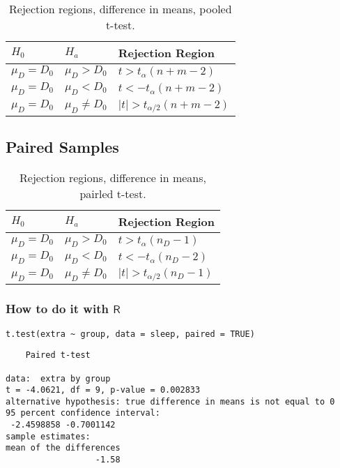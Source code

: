 \begin{table}[htb]
\caption[Rejection regions, difference in means, pooled t-test]{\label{tab-two-t-test-pooled}Rejection regions, difference in means, pooled t-test.}
\centering
\begin{tabular}{lll}
\(H_{0}\) & \(H_{a}\) & Rejection Region\\
\hline
\(\mu_{D} = D_{0}\) & \(\mu_{D} > D_{0}\) & \(t > t_{\alpha}(n + m - 2)\)\\
\(\mu_{D} = D_{0}\) & \(\mu_{D} < D_{0}\) & \(t < -t_{\alpha}(n + m -  2)\)\\
\(\mu_{D} = D_{0}\) & \(\mu_{D} \neq D_{0}\) & \( \vert t \vert > t_{\alpha/2}(n + m - 2)\)\\
\end{tabular}
\end{table}


\subsection{Paired Samples}
\label{sec-10-4-2}

\begin{table}[htb]
\caption[Rejection regions, difference in means, pairled t-test]{\label{tab-two-t-test-paired}Rejection regions, difference in means, pairled t-test.}
\centering
\begin{tabular}{lll}
\(H_{0}\) & \(H_{a}\) & Rejection Region\\
\hline
\(\mu_{D} = D_{0}\) & \(\mu_{D} > D_{0}\) & \(t > t_{\alpha}(n_{D} - 1)\)\\
\(\mu_{D} = D_{0}\) & \(\mu_{D} < D_{0}\) & \(t < -t_{\alpha}(n_{D} - 2)\)\\
\(\mu_{D} = D_{0}\) & \(\mu_{D} \neq D_{0}\) & \( \vert t \vert > t_{\alpha/2}(n_{D} - 1)\)\\
\end{tabular}
\end{table}


\subsubsection{How to do it with \(\mathsf{R}\)}
\label{sec-10-4-2-1}

\begin{verbatim}
t.test(extra ~ group, data = sleep, paired = TRUE)
\end{verbatim}

\begin{verbatim}
	Paired t-test

data:  extra by group
t = -4.0621, df = 9, p-value = 0.002833
alternative hypothesis: true difference in means is not equal to 0
95 percent confidence interval:
 -2.4598858 -0.7001142
sample estimates:
mean of the differences 
                  -1.58
\end{verbatim}

